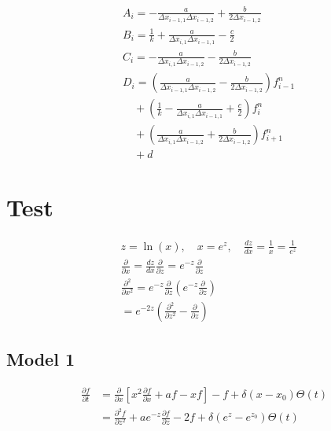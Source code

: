 \documentclass{article}
\begin{document}
    \begin{equation}
        \begin{split}
            &A_i =
            -\frac{a}{\Delta x_{i-1,1} \Delta x_{i-1,2}} + \frac{b}{2 \Delta x_{i-1,2}} \\
            &B_i =
            \frac{1}{k} + \frac{a}{\Delta x_{i,1} \Delta x_{i-1,1}} - \frac{c}{2}\\
            &C_i =
            -\frac{a}{\Delta x_{i,1} \Delta x_{i-1,2}} - \frac{b}{2 \Delta x_{i-1,2}}\\
            &D_i =
            \left(\frac{a}{\Delta x_{i-1,1} \Delta x_{i-1,2}} - \frac{b}{2 \Delta x_{i-1,2}}
                \right) f_{i-1}^{n} \\
            &\quad + \left( \frac{1}{k} - \frac{a}{\Delta x_{i,1} \Delta x_{i-1,1}}
                + \frac{c}{2} \right) f_i^n \\
            &\quad + \left(\frac{a}{\Delta x_{i,1} \Delta x_{i-1,2}} +
                \frac{b}{2 \Delta x_{i-1,2}}\right) f_{i+1}^{n} \\
            &\quad + d
        \end{split}
    \end{equation}

\section{Test}
    \begin{equation}
        \begin{split}
            &z = \ln(x), \quad x = e^z, \quad \frac{dz}{dx} = \frac{1}{x} = \frac{1}{e^z} \\
            & \frac{\partial }{\partial x} = \frac{dz}{dx} \frac{\partial } {\partial z}
            = e^{-z} \frac{\partial }{\partial z}\\
            & \frac{\partial^2 }{\partial x^2} = e^{-z} \frac{\partial } {\partial z}
            \left(e^{-z} \frac{\partial }{\partial z}\right) \\
            & = e^{-2z}\left( \frac{\partial^2}{\partial z^2} - \frac{\partial }{\partial z}
                       \right)
        \end{split}
    \end{equation}
\subsection{Model 1}
    \begin{equation}
        \begin{split}
            \frac{\partial f} {\partial t} &= \frac{\partial}{\partial x}
            \left[x^2 \frac{\partial f}{\partial x} + af - xf\right]
             - f 
             + \delta(x-x_0)\Theta(t) \\
            &= \frac{\partial^2 f}{\partial z^2}
            + ae^{-z} \frac{\partial f}{\partial z}
            - 2f
            + \delta(e^{z}-e^{z_0})\Theta(t)
        \end{split}
    \end{equation}
\end{document}
